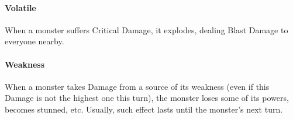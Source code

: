 \documentclass[itdr]{subfiles}
\begin{document}
\vfill
\paragraph{Volatile}
When a monster suffers Critical Damage, it explodes, dealing Blast Damage to everyone nearby.

\vfill
\paragraph{Weakness}
When a monster takes Damage from a source of its weakness (even if this Damage is not the highest one this turn), the monster loses some of its powers, becomes stunned, etc. Usually, such effect lasts until the monster's next turn.

\vfill
\end{document}
